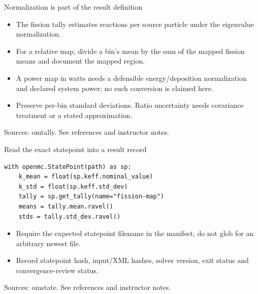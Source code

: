 \documentclass[aspectratio=169,11pt]{beamer}
\begin{document}
\begin{frame}[t,fragile]{Normalization is part of the result definition}
\fontsize{11.5}{14}\selectfont
\begin{itemize}\setlength{\itemsep}{2mm}
\item The fission tally estimates reactions per source particle under the eigenvalue normalization.
\item For a relative map, divide a bin's mean by the sum of the mapped fission means and document the mapped region.
\item A power map in watts needs a defensible energy/deposition normalization and declared system power; no such conversion is claimed here.
\item Preserve per-bin standard deviations. Ratio uncertainty needs covariance treatment or a stated approximation.
\end{itemize}
\vfill{\fontsize{6.5}{8}\selectfont\color{UTgray} Sources: omtally. See references and instructor notes.\par}
\end{frame}
\begin{frame}[t,fragile]{Read the exact statepoint into a result record}
\begin{lstlisting}
with openmc.StatePoint(path) as sp:
    k_mean = float(sp.keff.nominal_value)
    k_std = float(sp.keff.std_dev)
    tally = sp.get_tally(name="fission-map")
    means = tally.mean.ravel()
    stds = tally.std_dev.ravel()
\end{lstlisting}
\fontsize{10.5}{12.5}\selectfont
\begin{itemize}\setlength{\itemsep}{2mm}
\item Require the expected statepoint filename in the manifest; do not glob for an arbitrary newest file.
\item Record statepoint hash, input/XML hashes, solver version, exit status and convergence-review status.
\end{itemize}
\vfill{\fontsize{6.5}{8}\selectfont\color{UTgray} Sources: omstate. See references and instructor notes.\par}
\end{frame}
\end{document}
